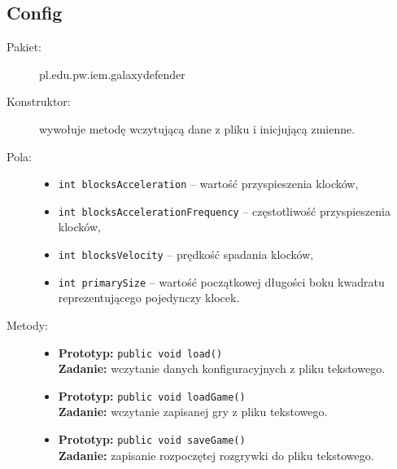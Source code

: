 \documentclass[a4paper]{article}
\newcommand{\prog}{\texttt}
\begin{document}
\subsection{Config}
\begin{description}
    \item[Pakiet:] pl.edu.pw.iem.galaxydefender
    \item[Konstruktor:] wywołuje metodę wczytującą dane z pliku i inicjującą zmienne.
    \item[Pola:] \hfill
    \begin{itemize}
        \item \prog{int blocksAcceleration} -- wartość przyspieszenia klocków,
        \item \prog{int blocksAccelerationFrequency} -- częstotliwość przyspieszenia klocków,
        \item \prog{int blocksVelocity} -- prędkość spadania klocków,
        \item \prog{int primarySize} -- wartość początkowej długości boku kwadratu reprezentującego pojedynczy klocek.
    \end{itemize}
    \item[Metody:] \hfill
    \begin{itemize}
        \item \textbf{Prototyp:} \prog{public void load()}\\\textbf{Zadanie:} wczytanie danych konfiguracyjnych z pliku tekstowego.
        \item \textbf{Prototyp:} \prog{public void loadGame()}\\\textbf{Zadanie:} wczytanie zapisanej gry z pliku tekstowego.
        \item \textbf{Prototyp:} \prog{public void saveGame()}\\\textbf{Zadanie:} zapisanie rozpoczętej rozgrywki do pliku tekstowego.
    \end{itemize}
\end{description}
\end{document}
